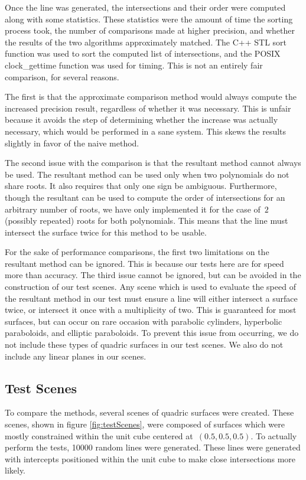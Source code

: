 \documentclass{cccg16}
\begin{document}
Once the line was generated, the intersections and their order were
computed along with some statistics.  These statistics were the amount
of time the sorting process took, the number of comparisons made at
higher precision, and whether the results of the two algorithms
approximately matched.  The C++ STL sort function was used to sort the
computed list of intersections, and the POSIX clock\_gettime function
was used for timing.  This is not an entirely fair comparison, for
several reasons.

The first is that the approximate comparison method would always
compute the increased precision result, regardless of whether it was
necessary.  This is unfair because it avoids the step of determining
whether the increase was actually necessary, which would be performed
in a sane system.  This skews the results slightly in favor of the naive
method.

The second issue with the comparison is that the resultant method
cannot always be used.  The resultant method can be used only when two
polynomials do not share roots.  It also requires that only one sign
be ambiguous.  Furthermore, though the resultant can be used to
compute the order of intersections for an arbitrary number of roots,
we have only implemented it for the case of~$2$ (possibly repeated)
roots for both polynomials.  This means that the line must intersect
the surface twice for this method to be usable.

For the sake of performance comparisons, the first two limitations on
the resultant method can be ignored.  This is because our tests here
are for speed more than accuracy.  The third issue cannot be ignored,
but can be avoided in the construction of our test scenes.  Any scene
which is used to evaluate the speed of the resultant method in our
test must ensure a line will either intersect a surface twice, or
intersect it once with a multiplicity of two.  This is guaranteed for
most surfaces, but can occur on rare occasion with parabolic
cylinders, hyperbolic paraboloids, and elliptic paraboloids.  To
prevent this issue from occurring, we do not include these types of
quadric surfaces in our test scenes.  We also do not include any
linear planes in our scenes.

\subsection{Test Scenes}
To compare the methods, several scenes of quadric surfaces were
created.  These scenes, shown in figure \ref{fig:testScenes}, were
composed of surfaces which were mostly constrained within the unit
cube centered at~$(0.5, 0.5, 0.5)$.  To actually perform the tests,
10000 random lines were generated.  These lines were generated with
intercepts positioned within the unit cube to make close intersections
more likely.
\end{document}
